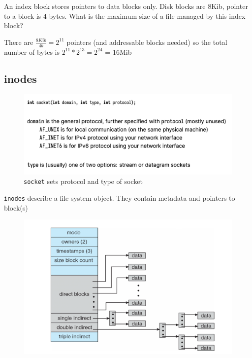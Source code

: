 \documentclass[../notes.tex]{subfiles}
\begin{document}
\begin{example}
    An index block stores pointers to data blocks only. Disk blocks are 8Kib, pointer to a block is 4 bytes. What is the maximum size of a file managed by this index block?

    There are $ \frac{8Kib}{4b} = 2^{11} $ pointers (and addressable blocks needed) so the total number of bytes is $ 2^{11 } * 2 ^{ 13 } = 2^{24} $ = 16Mib



\end{example}





\subsection{inodes}

\begin{figure}[H]
    \centering
    \includegraphics[width=0.8\linewidth]{img/image_2023-03-21-15-09-34.png}
    \caption{\texttt{socket} sets protocol and type of socket}
\end{figure}

\texttt{inodes} describe a file system object. They contain metadata and pointers to block(s)

\begin{figure}[H]
    \centering
    \includegraphics[width=0.8\linewidth]{img/image_2023-03-16-17-48-45.png}
\end{figure}
\end{document}
